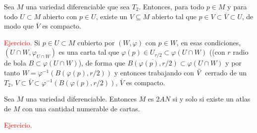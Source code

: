 \begin{prop}
Sea $M$ una variedad diferenciable que sea $T_2$. Entonces, para todo $p \in M$ y para todo $U\subset M$ abierto con $p \in U$, existe un $V\subseteq M$ abierto tal que $p \in V \subset \overline{V} \subset U$, de modo que $\overline{V}$ es compacto.
\end{prop}
\begin{dem}
    \textcolor{red}{Ejercicio.} Si $p \in U \subset M$ cubierto por $(W, \varphi)$ con $p \in W$, en esas condiciones, $(U \cap W, \varphi_{U \cap W})$ es una carta tal que $\varphi(p)  \in U_{r/2} \subset \varphi(U\cap W)$ ((con $r$ radio de bola $B \subset \varphi(U\cap W)$), de forma que $\overline{B(\varphi(p),r/2)} \subset \varphi(U \cap W)$ y por tanto $W = \varphi^{-1}(B(\varphi(p), r/2))$ y entonces trabajando con $\Bar{V}$ cerrado de un $T_2$, $V \subset \bar{V} \subset \varphi^{-1}(B(\varphi(p), r/2))$, $\bar{V}$ es compacto.
\end{dem}
\begin{prop}
Sea $M$ una variedad diferenciable. Entonces $M$ es $2AN$ si y solo si existe un atlas de $M$ con una cantidad numerable de cartas.
\end{prop}
\begin{dem} \textcolor{red}{Ejercicio.}
\end{dem}

